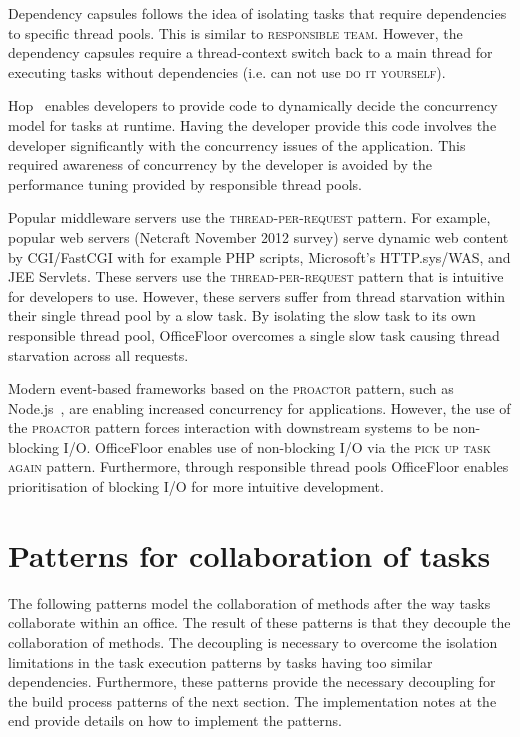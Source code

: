 \documentclass[prodmode]{style/acmlarge}
\begin{document}
Dependency capsules \cite{dependency-capsules} follows the idea of isolating
tasks that require dependencies to specific thread pools.  This is similar to
\textsc{responsible team}.  However, the dependency capsules require a
thread-context switch back to a main thread for executing tasks without
dependencies (i.e. can not use \textsc{do it yourself}).

Hop~\cite{hop} enables developers to provide code to dynamically decide the
concurrency model for tasks at runtime.  Having the developer provide this code
involves the developer significantly with the concurrency issues of the
application.  This required awareness of concurrency by the developer is
avoided by the performance tuning provided by responsible thread pools.

Popular middleware servers use the \textsc{thread-per-request} pattern.
For example, popular web servers (Netcraft November 2012 survey) serve dynamic
web content by CGI/FastCGI with for example PHP scripts, Microsoft's
HTTP.sys/WAS, and JEE Servlets. These servers use the
\textsc{thread-per-request} pattern that is intuitive for developers to use.
However, these servers suffer from thread starvation within their single thread
pool by a slow task.  By isolating the slow task to its own responsible thread
pool, OfficeFloor overcomes a single slow task causing thread starvation across
all requests.

Modern event-based frameworks based on the \textsc{proactor} pattern, such as
Node.js~\cite{nodejs}, are enabling increased concurrency for applications.
However, the use of the \textsc{proactor} pattern forces interaction with
downstream systems to be non-blocking I/O.  OfficeFloor enables use of
non-blocking I/O via the \textsc{pick up task again} pattern.  Furthermore,
through responsible thread pools OfficeFloor enables prioritisation of blocking
I/O for more intuitive development.




\section{Patterns for collaboration of tasks}

The following patterns model the collaboration of methods after the way tasks
collaborate within an office.  The result of these patterns is that they
decouple the collaboration of methods.  The decoupling is necessary to overcome
the isolation limitations in the task execution patterns by tasks having too
similar dependencies.  Furthermore, these patterns provide the necessary
decoupling for the build process patterns of the next section.  The
implementation notes at the end provide details on how to implement the
patterns.
\end{document}

